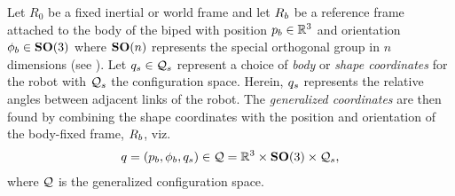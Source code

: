 Let $R_{0}$ be a fixed inertial or world frame and let $R_{b}$ be a reference
frame attached to the body of the biped with position $p_{b} \in \mathbb{R}^{3}$ and
orientation $\phi_{b} \in \mathbf{SO}(3)$ where $\mathbf{SO}(n)$ represents the special
orthogonal group in $n$ dimensions (see \cite{Conway1985}).
%
Let $q_{s} \in \mathcal{Q}_{s}$ represent a choice of {\em body} or {\em shape
  coordinates} for the robot with $\mathcal{Q}_{s}$ the configuration space.
%
Herein, $q_{s}$ represents the relative angles between adjacent links of the
robot.
%
The {\em generalized coordinates} are then found by combining the shape
coordinates with the position and orientation of the body-fixed frame, $R_{b}$,
viz.
%
\begin{align*}
  q = (p_{b}, \phi_{b}, q_{s}) \in \mathcal{Q} = \mathbb{R}^{3} \times \mathbf{SO}(3)
  \times \mathcal{Q}_{s},
\end{align*}
%
where $\mathcal{Q}$ is the generalized configuration space.

